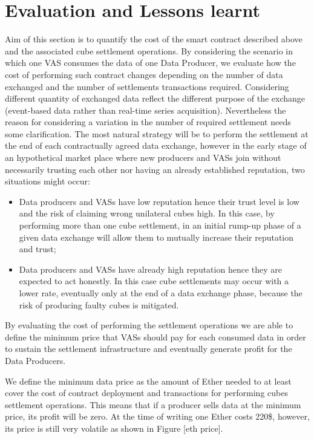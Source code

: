 \documentclass[chi_draft]{sigchi}
\begin{document}
\section{Evaluation and Lessons learnt}
Aim of this section is to quantify the cost of the smart contract described above and the associated cube settlement operations. By considering the scenario in which one VAS consumes the data of one Data Producer, we evaluate how the cost of performing such contract changes depending on the number of data exchanged and the number of settlements transactions required. Considering different quantity of exchanged data reflect the different purpose of the exchange (event-based data rather than real-time series acquisition). Nevertheless the reason for considering a variation in the number of required settlement needs some clarification. The most natural strategy will be to perform the settlement at the end of each contractually agreed data exchange, however in the early stage of an hypothetical market place where new producers and VASs join without necessarily trusting each other nor having an already established reputation, two situations might occur:
\begin{itemize}
	\item {Data producers and VASs have low reputation hence their trust level is low and the risk of claiming wrong unilateral cubes high. In this case, by performing more than one cube settlement, in an initial rump-up phase of a given data exchange will allow them to mutually increase their reputation and trust;}
	\item {Data producers and VASs have already high reputation hence they are expected to act honestly. In this case cube settlements may occur with a lower rate, eventually only at the end of a data exchange phase, because the risk of producing faulty cubes is mitigated.}
\end{itemize}

By evaluating the cost of performing the settlement operations we are able to define the minimum price that VASs should pay for each consumed data in order to sustain the settlement infrastructure and eventually generate profit for the Data Producers.

We define the minimum data price as the amount of Ether needed to at least cover the cost of contract deployment and transactions for performing cubes settlement operations. This means that if a producer sells data at the minimum price, its profit will be zero. 
At the time of writing one Ether costs 220\$, however, its price is still very volatile as shown in Figure [eth price].
\end{document}
